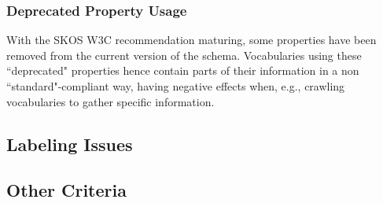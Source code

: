 \subsubsection{Deprecated Property Usage} With the SKOS W3C recommendation maturing, some properties have been removed from the current version of the schema. Vocabularies using these ``deprecated" properties hence contain parts of their information in a non ``standard"-compliant way, having negative effects when, e.g., crawling vocabularies to gather specific information.


\subsection{Labeling Issues}

\subsection{Other Criteria}